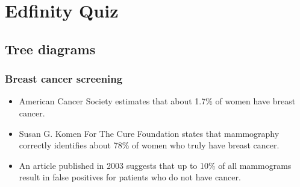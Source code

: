 \documentclass[slidestop,compress,mathserif]{beamer}
\begin{document}
\section{Edfinity Quiz}


\subsection{Tree diagrams}


\begin{frame}
\frametitle{Breast cancer screening}

\begin{itemize}

\item American Cancer Society estimates that about 1.7\% of women have breast cancer. \\
{\small{}}

\item Susan G. Komen For The Cure Foundation states that mammography correctly identifies about 78\% of women who truly have breast cancer. \\
{\small{}}

\item An article published in 2003 suggests that up to 10\% of all mammograms result in false positives for patients who do not have cancer. \\{\small {}}

\end{itemize}

\vfill


\end{frame}

\end{document}

